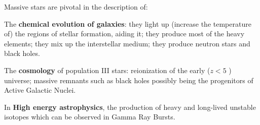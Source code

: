 \documentclass[main.tex]{subfiles}
\begin{document}
Massive stars are pivotal in the description of: 

The \textbf{chemical evolution of galaxies}: they light up (increase the temperature of) the regions of stellar formation, aiding it; they produce most of the heavy elements; they mix up the interstellar medium; they produce neutron stars and black holes.

The \textbf{cosmology} of population III stars: 
reionization of the early (\(z < 5\) ) universe; 
massive remnants such as black holes possibly being the progenitors of Active Galactic Nuclei.

In \textbf{High energy astrophysics}, the production of heavy and long-lived unstable isotopes which can be observed in Gamma Ray Bursts.

\end{document}
